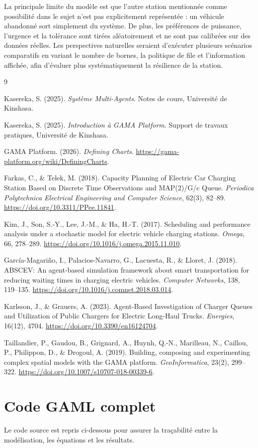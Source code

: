 \documentclass[11pt]{article}
\begin{document}
La principale limite du modèle est que l'autre station mentionnée comme possibilité dans le sujet n'est pas explicitement représentée : un véhicule abandonné sort simplement du système. De plus, les préférences de puissance, l'urgence et la tolérance sont tirées aléatoirement et ne sont pas calibrées sur des données réelles. Les perspectives naturelles seraient d'exécuter plusieurs scénarios comparatifs en variant le nombre de bornes, la politique de file et l'information affichée, afin d'évaluer plus systématiquement la résilience de la station.

\newpage
\begin{thebibliography}{9}

Kasereka, S. (2025).
\emph{Système Multi-Agents}.
Notes de cours, Université de Kinshasa.

Kasereka, S. (2025).
\emph{Introduction à GAMA Platform}.
Support de travaux pratiques, Université de Kinshasa.

GAMA Platform. (2026).
\emph{Defining Charts}.
\url{https://gama-platform.org/wiki/DefiningCharts}.

Farkas, C., \& Telek, M. (2018).
Capacity Planning of Electric Car Charging Station Based on Discrete Time Observations and MAP(2)/G/c Queue.
\emph{Periodica Polytechnica Electrical Engineering and Computer Science}, 62(3), 82--89.
\url{https://doi.org/10.3311/PPee.11841}.

Kim, J., Son, S.-Y., Lee, J.-M., \& Ha, H.-T. (2017).
Scheduling and performance analysis under a stochastic model for electric vehicle charging stations.
\emph{Omega}, 66, 278--289.
\url{https://doi.org/10.1016/j.omega.2015.11.010}.

García-Magariño, I., Palacios-Navarro, G., Lacuesta, R., \& Lloret, J. (2018).
ABSCEV: An agent-based simulation framework about smart transportation for reducing waiting times in charging electric vehicles.
\emph{Computer Networks}, 138, 119--135.
\url{https://doi.org/10.1016/j.comnet.2018.03.014}.

Karlsson, J., \& Grauers, A. (2023).
Agent-Based Investigation of Charger Queues and Utilization of Public Chargers for Electric Long-Haul Trucks.
\emph{Energies}, 16(12), 4704.
\url{https://doi.org/10.3390/en16124704}.

Taillandier, P., Gaudou, B., Grignard, A., Huynh, Q.-N., Marilleau, N., Caillou, P., Philippon, D., \& Drogoul, A. (2019).
Building, composing and experimenting complex spatial models with the GAMA platform.
\emph{GeoInformatica}, 23(2), 299--322.
\url{https://doi.org/10.1007/s10707-018-00339-6}.

\end{thebibliography}

\clearpage
\appendix
\section{Code GAML complet}\label{annexe:code}

Le code source est repris ci-dessous pour assurer la traçabilité entre la modélisation, les équations et les résultats.


\end{document}
